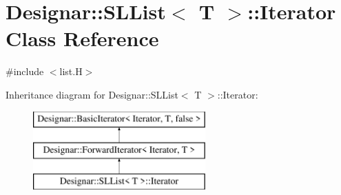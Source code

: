 \hypertarget{class_designar_1_1_s_l_list_1_1_iterator}{}\section{Designar\+:\+:S\+L\+List$<$ T $>$\+:\+:Iterator Class Reference}
\label{class_designar_1_1_s_l_list_1_1_iterator}


{\ttfamily \#include $<$list.\+H$>$}

Inheritance diagram for Designar\+:\+:S\+L\+List$<$ T $>$\+:\+:Iterator\+:\begin{figure}[H]
\begin{center}
\leavevmode
\includegraphics[height=3.000000cm]{class_designar_1_1_s_l_list_1_1_iterator}
\end{center}
\end{figure}
